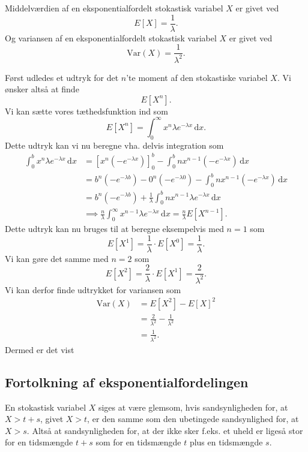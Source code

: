 \begin{sæt} 
  Middelværdien af en eksponentialfordelt stokastisk variabel $X$ er givet ved
  \[ 
    E[X] = \frac{1}{\lambda}
  .\]
  Og variansen af en eksponentialfordelt stokastisk variabel $X$ er givet ved
  \[ 
  \mathrm{Var}(X) = \frac{1}{\lambda^2}
  .\]
  
  \tcblower
  Først udledes et udtryk for det $n$'te moment af den stokastiske variabel $X$. Vi ønsker altså at finde
  \[ 
    E\left[X^{n}\right]
  .\]
  Vi kan sætte vores tæthedsfunktion ind som
  \[ 
    E \left[ X^{n} \right] = \int_{0}^{\infty} x^{n}\lambda e^{-\lambda x} \, \mathrm{d}x 
  .\]
  Dette udtryk kan vi nu beregne vha. delvis integration som
  \begin{align*}
    \int_{0}^{b} x^{n}\lambda e^{-\lambda x} \, \mathrm{d}x &= \left[ x^{n} \left( -e^{-\lambda x} \right) \right]_0^{b} - \int_{0}^{b} n x^{n-1} \left( -e^{-\lambda x} \right) \, \mathrm{d}x \\
    &= b^{n} \left( -e^{-\lambda b} \right) - 0^{n} \left( -e^{-\lambda 0} \right) - \int_{0}^{b} nx^{n-1} \left( -e^{-\lambda x} \right) \, \mathrm{d}x  \\
    &= b^{n} \left( -e^{-\lambda b} \right) + \frac{1}{\lambda} \int_{0}^{b} nx^{n-1}\lambda e^{-\lambda x} \, \mathrm{d}x  \\
    &\implies \frac{n}{\lambda} \int_{0}^{\infty} x^{n-1}\lambda e^{-\lambda x} \, \mathrm{d}x = \frac{n}{\lambda} E[X^{n-1}]
  .\end{align*}
  Dette udtryk kan nu bruges til at beregne eksempelvis med $n = 1$ som
  \[ 
    E[X^{1}] = \frac{1}{\lambda} \cdot E[X^{0}] = \frac{1}{\lambda}
  .\]
  Vi kan gøre det samme med $n = 2$ som
  \[ 
    E[X^{2}] = \frac{2}{\lambda} \cdot E[X^{1}] = \frac{2}{\lambda^2}
  .\]
  Vi kan derfor finde udtrykket for variansen som
  \begin{align*}
    \mathrm{Var}(X) &= E \left[ X^2 \right] - E[X]^2 \\
    &= \frac{2}{\lambda^2} - \frac{1}{\lambda^2} \\
    &= \frac{1}{\lambda^2}
  .\end{align*}
  Dermed er det vist
\end{sæt}

\subsection{Fortolkning af eksponentialfordelingen}
En stokastisk variabel $X$ siges at være glemsom, hvis sandsynligheden for, at $X > t + s$, givet $X > t$, er den samme som den ubetingede sandsynlighed for, at $X > s$. Altså at sandsynligheden for, at der ikke sker f.eks. et uheld er ligeså stor for en tidsmængde $t + s$ som for en tidsmængde $t$ plus en tidsmængde $s$. 

